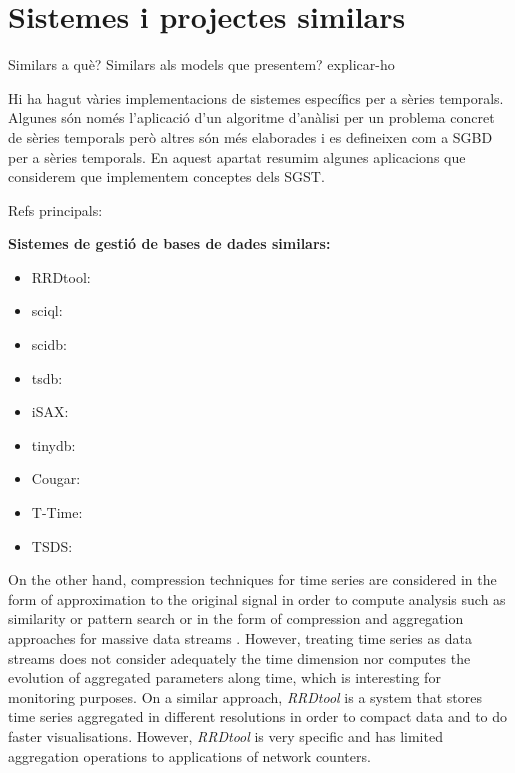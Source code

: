 
\section{Sistemes i projectes similars}




Similars a què? Similars als models que presentem? explicar-ho


Hi ha hagut vàries implementacions de sistemes específics per a sèries
temporals. Algunes són només l'aplicació d'un algoritme d'anàlisi per
un problema concret de sèries temporals però altres són més elaborades
i es defineixen com a SGBD per a sèries temporals.  En aquest apartat
resumim algunes aplicacions que considerem que implementem conceptes
dels SGST.






Refs principals\todo{}:


\textbf{Sistemes de gestió de bases de dades similars:}
\begin{itemize}
\item RRDtool: \cite{lisa98:oetiker,rrdtool}
\item sciql: \cite{sciql,zhang11,kersten11}
\item scidb: \cite{stonebraker09:scidb,scidb}
\item tsdb: \cite{deri12:tsdb_compressed_database}
\item iSAX: \cite{keogh10:isax,keogh08:isax}
\item tinydb: %
\item Cougar: %
\item T-Time: %
\item TSDS: %
\end{itemize}

On the other hand, compression techniques for time series are
considered in the form of approximation to the original signal in
order to compute analysis such as similarity or pattern search
\cite{fu11,keogh01,last01} or in the form of compression and
aggregation approaches for massive data streams
\cite{cormode08:pods,bonnet01}. However, treating time series as data
streams does not consider adequately the time dimension nor computes
the evolution of aggregated parameters along time, which is
interesting for monitoring purposes.  On a similar approach,
\emph{RRDtool} \cite{rrdtool} is a system that stores time series
aggregated in different resolutions in order to compact data and to do
faster visualisations. However, \emph{RRDtool} is very specific and
has limited aggregation operations to applications of network
counters.




